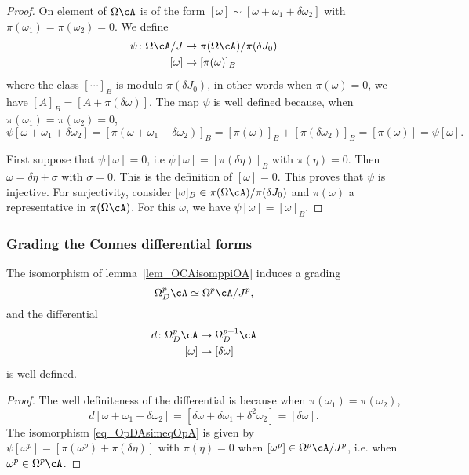 \begin{proof}
On element of $\Omega\cA$ is of the form $[\omega]\sim [\omega+\omega_1+\delta\omega_2]$ with $\pi(\omega_1)=\pi(\omega_2)=0$. We define
\begin{equation}
\begin{aligned}
 \psi\colon \Omega\cA/J&\to \pi(\Omega\cA)/\pi(\delta J_0) \\
[\omega]&\mapsto [\pi(\omega)]_B
\end{aligned}
\end{equation}
where the class $[\cdots]_B$ is modulo $\pi(\delta J_0)$, in other words when $\pi(\omega)=0$, we have $[A]_B=[A+\pi(\delta\omega)]$.  The map $\psi$ is well defined because, when $\pi(\omega_1)=\pi(\omega_2)=0$,
\[
\psi[\omega+\omega_1+\delta\omega_2]=[\pi(\omega+\omega_1+\delta\omega_2)]_B
		=[\pi(\omega)]_B+[\pi(\delta\omega_2)]_B
		=[\pi(\omega)]
		=\psi[\omega].
\]

First suppose that $\psi[\omega]=0$, i.e $\psi[\omega]=[\pi(\delta\eta)]_B$ with $\pi(\eta)=0$. Then $\omega=\delta\eta+\sigma$ with $\sigma=0$. This is the definition of $[\omega]=0$. This proves that $\psi$ is injective. For surjectivity, consider $[\omega]_B\in\pi(\Omega\cA)/\pi(\delta J_0)$ and $\pi(\omega)$ a representative in $\pi(\Omega\cA)$. For this $\omega$, we have $\psi[\omega]=[\omega]_B$.
\end{proof}

\subsubsection{Grading the Connes differential forms}

\begin{lemma}			\label{LemOmpmdDp}
The isomorphism of lemma~\ref{lem_OCAisomppiOA} induces a grading
\begin{equation} \label{eq_OpDAsimeqOpA}
  \Omega^p_D\cA\simeq \Omega^p\cA/J^p,
\end{equation}
and the differential
\begin{equation}
\begin{aligned}
 d\colon \Omega^p_D\cA&\to \Omega^{p+1}_D\cA \\
[\omega]&\mapsto [\delta\omega]
\end{aligned}
\end{equation}
is well defined.
  \label{lem_isomgraODA}
\end{lemma}

\begin{proof}
 The well definiteness of the differential is because when $\pi(\omega_1)=\pi(\omega_2)$,
\[
d[\omega+\omega_1+\delta\omega_2]=[\delta\omega+\delta\omega_1+\delta^2\omega_2]
		=[\delta\omega].
\]
The isomorphism \eqref{eq_OpDAsimeqOpA} is given by   $\psi[\omega^p]=[\pi(\omega^p)+\pi(\delta\eta)]$ with $\pi(\eta)=0$ when $[\omega^p]\in\Omega^p\cA/J^p$, i.e. when $\omega^p\in\Omega^p\cA$.
\end{proof}


